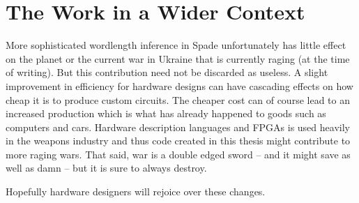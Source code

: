 \section{The Work in a Wider Context}
More sophisticated wordlength inference in Spade unfortunately has little effect on the planet or the current war in Ukraine that is currently raging (at the time of writing). But this contribution need not be discarded as useless. A slight improvement in efficiency for hardware designs can have cascading effects on how cheap it is to produce custom circuits. The cheaper cost can of course lead to an increased production which is what has already happened to goods such as computers and cars. Hardware description languages and FPGAs is used heavily in the weapons industry and thus code created in this thesis might contribute to more raging wars. That said, war is a double edged sword -- and it might save as well as damn -- but it is sure to always destroy.

Hopefully hardware designers will rejoice over these changes.
